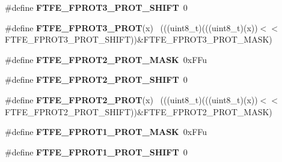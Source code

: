 \begin{DoxyCompactItemize}
\item 
\hypertarget{group___f_t_f_e___register___masks_ga92b7eeff49fd75ccb8b325326e70967d}{}\#define {\bfseries F\+T\+F\+E\+\_\+\+F\+P\+R\+O\+T3\+\_\+\+P\+R\+O\+T\+\_\+\+S\+H\+I\+F\+T}~0\label{group___f_t_f_e___register___masks_ga92b7eeff49fd75ccb8b325326e70967d}

\item 
\hypertarget{group___f_t_f_e___register___masks_ga2ec13a846c403cd979e9368ed7bb7096}{}\#define {\bfseries F\+T\+F\+E\+\_\+\+F\+P\+R\+O\+T3\+\_\+\+P\+R\+O\+T}(x)                                        ~(((uint8\+\_\+t)(((uint8\+\_\+t)(x))$<$$<$F\+T\+F\+E\+\_\+\+F\+P\+R\+O\+T3\+\_\+\+P\+R\+O\+T\+\_\+\+S\+H\+I\+F\+T))\&F\+T\+F\+E\+\_\+\+F\+P\+R\+O\+T3\+\_\+\+P\+R\+O\+T\+\_\+\+M\+A\+S\+K)\label{group___f_t_f_e___register___masks_ga2ec13a846c403cd979e9368ed7bb7096}

\item 
\hypertarget{group___f_t_f_e___register___masks_gabb7b44e7187830da8206888d207d9e87}{}\#define {\bfseries F\+T\+F\+E\+\_\+\+F\+P\+R\+O\+T2\+\_\+\+P\+R\+O\+T\+\_\+\+M\+A\+S\+K}~0x\+F\+Fu\label{group___f_t_f_e___register___masks_gabb7b44e7187830da8206888d207d9e87}

\item 
\hypertarget{group___f_t_f_e___register___masks_ga64e4b03106065078a966a0505a18f7bc}{}\#define {\bfseries F\+T\+F\+E\+\_\+\+F\+P\+R\+O\+T2\+\_\+\+P\+R\+O\+T\+\_\+\+S\+H\+I\+F\+T}~0\label{group___f_t_f_e___register___masks_ga64e4b03106065078a966a0505a18f7bc}

\item 
\hypertarget{group___f_t_f_e___register___masks_gab88e0acda80130f8230419dcb92b1d71}{}\#define {\bfseries F\+T\+F\+E\+\_\+\+F\+P\+R\+O\+T2\+\_\+\+P\+R\+O\+T}(x)                                        ~(((uint8\+\_\+t)(((uint8\+\_\+t)(x))$<$$<$F\+T\+F\+E\+\_\+\+F\+P\+R\+O\+T2\+\_\+\+P\+R\+O\+T\+\_\+\+S\+H\+I\+F\+T))\&F\+T\+F\+E\+\_\+\+F\+P\+R\+O\+T2\+\_\+\+P\+R\+O\+T\+\_\+\+M\+A\+S\+K)\label{group___f_t_f_e___register___masks_gab88e0acda80130f8230419dcb92b1d71}

\item 
\hypertarget{group___f_t_f_e___register___masks_ga1e6a0ea36b9fdb8f847e4a750172e45a}{}\#define {\bfseries F\+T\+F\+E\+\_\+\+F\+P\+R\+O\+T1\+\_\+\+P\+R\+O\+T\+\_\+\+M\+A\+S\+K}~0x\+F\+Fu\label{group___f_t_f_e___register___masks_ga1e6a0ea36b9fdb8f847e4a750172e45a}

\item 
\hypertarget{group___f_t_f_e___register___masks_ga0b97e40cb2ae6312e945abee0e35ad75}{}\#define {\bfseries F\+T\+F\+E\+\_\+\+F\+P\+R\+O\+T1\+\_\+\+P\+R\+O\+T\+\_\+\+S\+H\+I\+F\+T}~0\label{group___f_t_f_e___register___masks_ga0b97e40cb2ae6312e945abee0e35ad75}


\end{DoxyCompactItemize}
